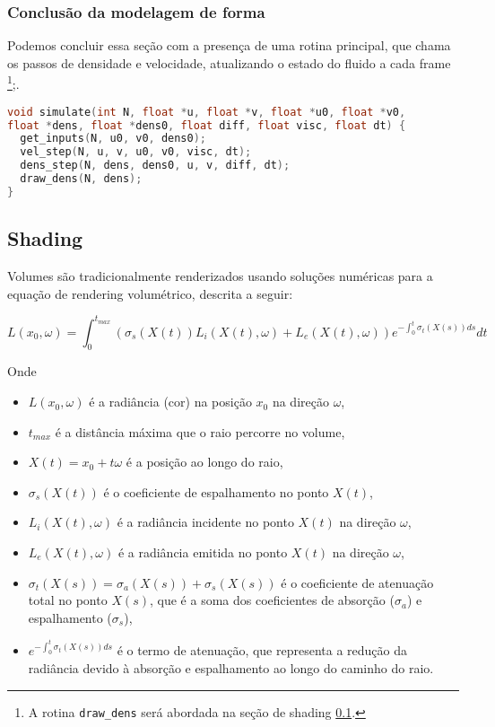 \subsubsection{Conclusão da modelagem de forma}
Podemos concluir essa seção com a presença de uma rotina principal, que chama os passos de densidade e velocidade, atualizando o estado do fluido a cada frame \footnote{A rotina \texttt{draw\_dens} será abordada na seção de shading \ref{sec:shading}.};. 
\begin{lstlisting}[language=C]
void simulate(int N, float *u, float *v, float *u0, float *v0,
float *dens, float *dens0, float diff, float visc, float dt) {
  get_inputs(N, u0, v0, dens0);
  vel_step(N, u, v, u0, v0, visc, dt);
  dens_step(N, dens, dens0, u, v, diff, dt);
  draw_dens(N, dens);
}
\end{lstlisting}

\subsection{Shading}
\label{sec:shading}

Volumes são tradicionalmente renderizados usando soluções numéricas para a equação de rendering volumétrico, descrita a seguir:

$$
L(x_0, \omega) = \int_{0}^{t_{max}} (\sigma_s(X(t)) L_i(X(t), \omega) + L_e(X(t), \omega))e^{-\int_{0}^{t} \sigma_t(X(s)) ds} dt
$$

Onde
\begin{itemize}
  \item $L(x_0, \omega)$ é a radiância (cor) na posição $x_0$ na direção $\omega$,
  \item $t_{max}$ é a distância máxima que o raio percorre no volume,
  \item $X(t) = x_0 + t\omega$ é a posição ao longo do raio,
  \item $\sigma_s(X(t))$ é o coeficiente de espalhamento no ponto $X(t)$,
  \item $L_i(X(t), \omega)$ é a radiância incidente no ponto $X(t)$ na direção $\omega$,
  \item $L_e(X(t), \omega)$ é a radiância emitida no ponto $X(t)$ na direção $\omega$,
  \item $\sigma_t(X(s)) = \sigma_a(X(s)) + \sigma_s(X(s))$ é o coeficiente de atenuação total no ponto $X(s)$, que é a soma dos coeficientes de absorção ($\sigma_a$) e espalhamento ($\sigma_s$),
  \item $e^{-\int_{0}^{t} \sigma_t(X(s)) ds}$ é o termo de atenuação, que representa a redução da radiância devido à absorção e espalhamento ao longo do caminho do raio.
\end{itemize}

